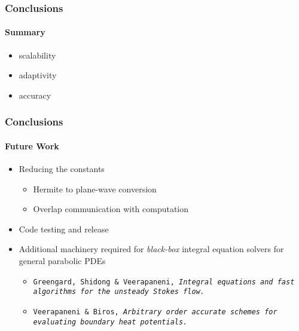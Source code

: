\begin{frame}
\frametitle{Conclusions}
\framesubtitle{Summary}

\begin{itemize}
\item  scalability 
\item  adaptivity
\item  accuracy
\end{itemize}

\end{frame}


\begin{frame}
\frametitle{Conclusions}
\framesubtitle{Future Work}
\begin{itemize}
\item  Reducing the constants
         \begin{itemize}
	\item Hermite to plane-wave conversion
            \item Overlap communication with computation
         \end{itemize}
\item  Code testing and release
%
\item Additional machinery required for {\em black-box} integral equation solvers for general parabolic PDEs 
          \begin{itemize}
	 \item  {\footnotesize \texttt{Greengard, Shidong \& Veerapaneni, {\em Integral equations and fast algorithms for the unsteady  Stokes  flow.}}}
             \item {\footnotesize \texttt{Veerapaneni \& Biros, {\em Arbitrary order accurate schemes for evaluating boundary heat potentials.}}}
          \end{itemize}
\end{itemize}

\end{frame}